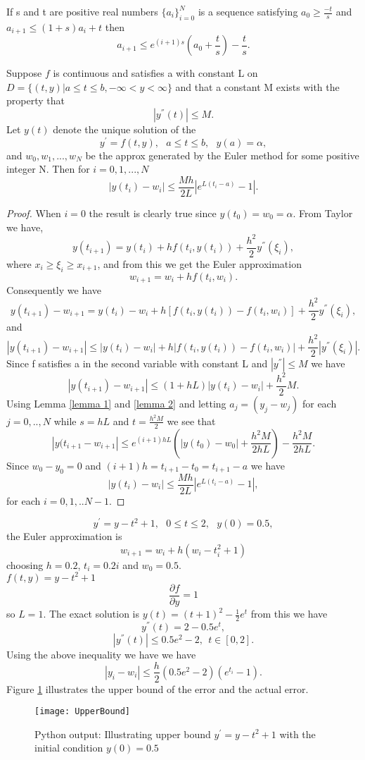 \begin{lemma}
\label{lemma 2}
If s and t are positive real numbers $\{a_i\}_{i=0}^{N}$ is a sequence satisfying $a_0 \geq \frac{-t}{s}$ and $a_{i+1} \leq (1+s)a_i +t $
then
\[a_{i+1} \leq e^{(i+1)s}\left(a_0+\frac{t}{s}\right)-\frac{t}{s}. \] 
\end{lemma}
\begin{theorem}
\label{Euler bound}
Suppose $f$ is continuous and satisfies a  with constant
L on $D=\{(t,y)|a\leq t \leq b, -\infty < y < \infty \}$ and that a constant M
exists with the property that 
\[ |y^{''}(t)|\leq M. \]
Let $y(t)$ denote the unique solution of the 
\[ y^{'}=f(t,y), \ \ \ a\leq t \leq b, \ \ \ y(a)=\alpha, \]
and $w_0,w_1,...,w_N$ be the approx generated by the Euler method for some
positive integer N.  Then for $i=0,1,...,N$
\[ |y(t_i)-w_i| \leq \frac{Mh}{2L}|e^{L(t_i-a)}-1|. \]
\end{theorem}
\begin{proof}
When $i=0$ the result is clearly true since $y(t_0)=w_0=\alpha$.
From Taylor we have,
\[y(t_{i+1})=y(t_i)+hf(t_i,y(t_i))+\frac{h^2}{2}y^{''}(\xi_i), \]
where $x_i \geq \xi_i \geq x_{i+1}$, and from this we get the Euler approximation
\[w_{i+1}=w_i + hf(t_i,w_i). \]
Consequently we have
\[y(t_{i+1})-w_{i+1}=y(t_i)-w_i+h[f(t_i,y(t_i))-f(t_i,w_i)]+\frac{h^2}{2}y^{''}(\xi_i), \]
and
\[|y(t_{i+1})-w_{i+1}|\leq |y(t_i)-w_i|+h|f(t_i,y(t_i))-f(t_i,w_i)|+\frac{h^2}{2}|y^{''}(\xi_i)|. \]
Since f satisfies a  in the second variable with constant L
and $|y^{''}|\leq M$ we have
\[|y(t_{i+1})-w_{i+1}|\leq (1+hL)|y(t_i)-w_i|+\frac{h^2}{2}M. \]
Using Lemma \ref{lemma 1} and \ref{lemma 2} and letting $a_j=(y_j-w_j)$ for each
$j=0,..,N$ while $s=hL$ and $t=\frac{h^2M}{2}$ we see that
\[|y(t_{i+1}-w_{i+1}|\leq e^{(i+1)hL}(|y(t_0)-w_0|+\frac{h^2M}{2hL}) -\frac{h^2M}{2hL}. \]
Since $w_0-y_0=0$ and $(i+1)h=t_{i+1}-t_0=t_{i+1}-a$ we have
\[ |y(t_i)-w_i| \leq \frac{Mh}{2L}|e^{L(t_i-a)}-1|, \]
for each $i=0,1,..N-1$.
\end{proof}
\begin{example}
\[y^{'}=y-t^2+1, \ \ \ 0 \leq t \leq 2, \ \ \ y(0)=0.5, \]
the Euler approximation is
\[w_{i+1} = w_i + h(w_i-t_i^2+1) \]
choosing $h=0.2$, $t_i=0.2i$ and $w_0=0.5$. \\
$f(t,y)=y-t^2+1$
\[\frac{\partial f}{\partial y}=1 \]
so $L=1$. The exact solution is $y(t)=(t+1)^2-\frac{1}{2}e^t$ from this we have
\[y^{''}(t) = 2-0.5e^t, \]
\[|y^{''}(t)| \leq 0.5e^2-2, \ \ t\in[0,2].\]
Using the above inequality we have we have
\[|y_i-w_i| \leq \frac{h}{2}(0.5e^2-2)(e^{t_i}-1).\]
Figure \ref{UpperBound Figure} illustrates the upper bound of the error and the actual error.
\end{example}
\begin{figure}[h]
\centering
\texttt{[image: UpperBound]}
\caption{Python output: Illustrating upper bound $y^{'}=y-t^2+1$ with the initial condition $y(0)=0.5$ }
\label{UpperBound Figure}
\end{figure}

